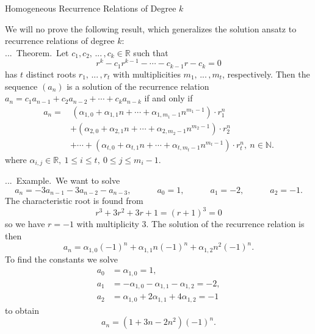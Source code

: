 \documentclass[smaller,hyperref={CJKbookmarks=true}]{beamer}
\newcommand{\N}{\mathbb{N}} \newcommand{\Z}{\mathbb{Z}} \newcommand{\Q}{\mathbb{Q}}
\newcommand{\R}{\mathbb{R}}
\newcounter{zhuo}[subsection]
\renewcommand{\thezhuo}{\thesection.\thesubsection.\arabic{zhuo}}
\newenvironment{EXAMPLE}{\stepcounter{zhuo}\alert{\!\thezhuo.~Example.\,}}{}
\newenvironment{THEOREM}{\stepcounter{zhuo}\alert{\thezhuo.~Theorem.\,}}{}
\begin{document}
\begin{frame}{Homogeneous Recurrence Relations of Degree $k$}
\begin{spacing}{1.05}
We will no prove the following result, which generalizes the solution ansatz
to recurrence relations of degree $k$:\\[4pt]
\begin{THEOREM}
Let $c_1,c_2,\,...\,,c_k\in\R$ such that
\[r^k-c_1r^{k-1}-\cdots-c_{k-1}r-c_k=0\]
has $t$ distinct roots $r_1,\,...\,,r_t$ with multiplicities $m_1,\,...\,,m_t$, respectively. Then the sequence $(a_n)$ is a solution of the recurrence relation $a_n=c_1a_{n-1}+c_2a_{n-2}+\cdots+c_ka_{n-k}$ if and only if
\begin{equation*}
  \begin{split}
     a_n =&\,(\alpha_{1,0}+\alpha_{1,1}n+\cdots+\alpha_{1,m_1-1}n^{m_1-1})\cdot r_1^n \\
       &+(\alpha_{2,0}+\alpha_{2,1}n+\cdots+\alpha_{2,m_2-1}n^{m_2-1})\cdot r_2^n \\
       &+\cdots+(\alpha_{t,0}+\alpha_{t,1}n+\cdots+\alpha_{t,m_t-1}n^{m_t-1})\cdot r_t^n,~n\in\N.
  \end{split}
\end{equation*}
where $\alpha_{i,j}\in\R,~1\leq i\leq t,~0\leq j\leq m_i-1$.
\end{THEOREM}
\end{spacing}
\newpage
\begin{spacing}{0.8}
\begin{EXAMPLE}
We want to solve
\[a_n=-3a_{n-1}-3a_{n-2}-a_{n-3},\qquad\quad
a_0=1,\qquad\quad a_1=-2,\qquad\quad
a_2=-1.\]
The characteristic root is found from
\[r^3+3r^2+3r+1=(r+1)^3=0\]
so we have $r=-1$ with multiplicity 3. The solution of the recurrence relation is then
\[a_n=\alpha_{1,0}(-1)^n+\alpha_{1,1}n(-1)^n+\alpha_{1,2}n^2(-1)^n.\]
To find the constants we solve
\begin{align*}
  a_0 &=\alpha_{1,0}=1, \\
  a_1 &=-\alpha_{1,0}-\alpha_{1,1}-\alpha_{1,2}=-2, \\
  a_2 &=\alpha_{1,0}+2\alpha_{1,1}+4\alpha_{1,2}=-1
\end{align*}
to obtain
\[a_n=(1+3n-2n^2)(-1)^n.\]
\end{EXAMPLE}
\end{spacing}
\end{frame}
\end{document}
